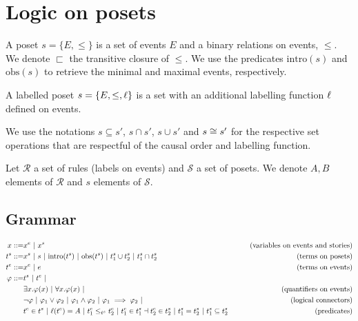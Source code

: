 \section{Logic on posets}

\begin{definition}[Poset]
  \label{def:poset}
  A poset $s=\{E,\leq\}$ is a set of events $E$ and a binary relations on events, $\leq$. We denote $\sqsubset$ the transitive closure of $\leq$.
  We use the predicates $\text{intro}(s)$ and $\text{obs}(s)$ to retrieve the minimal and maximal events, respectively.

  A labelled poset $s=\{E,\leq,\ell\}$ is a set with an additional labelling function $\ell$ defined on events.
\end{definition}


We use the notations $s \subseteq s'$, $s\cap s'$, $s\cup s'$ and $s\cong s'$ for the respective set operations that are respectful of the causal order and labelling function.

Let $\mathcal{R}$ a set of rules (labels on events) and $\mathcal{S}$ a set of posets.
We denote $A,B$ elements of $\mathcal{R}$ and $s$ elements of $\mathcal{S}$.

\subsection{Grammar}

\begin{align*}
  x ::= & x^e ~|~ x^s & \tag{variables on events and stories} \\
  t^s ::= & x^s ~|~ s ~|~ \text{intro}(t^s) ~|~ \text{obs}(t^s) ~|~ t^s_1 \cup t^s_2 ~|~ t^s_1 \cap t^s_2 &\tag{terms on posets} \\
  t^e ::= & x^e ~|~ e & \tag{terms on events}
  \\
  \varphi ::= & t^s ~|~ t^e ~| \\
  & \exists x.\varphi(x) ~|~ \forall x.\varphi(x) ~|&\tag{quantifiers on events}\\
  & \neg \varphi ~|~ \varphi_1 \vee \varphi_2~|~\varphi_1 \wedge \varphi_2~|~\varphi_1 \implies \varphi_2~|&\tag{logical connectors}\\
  & t^e\in t^s ~|~ \ell(t^e) = A ~|~ t^e_1 \leq_{t^s} t^e_2 ~|~ t^e_1\in t^s_1 \dashv t^e_2\in t^s_2~|~ t^s_1 = t^s_2 ~|~ t^s_1\subseteq t^s_2
  & \tag{predicates}\\
  \\
\end{align*}

